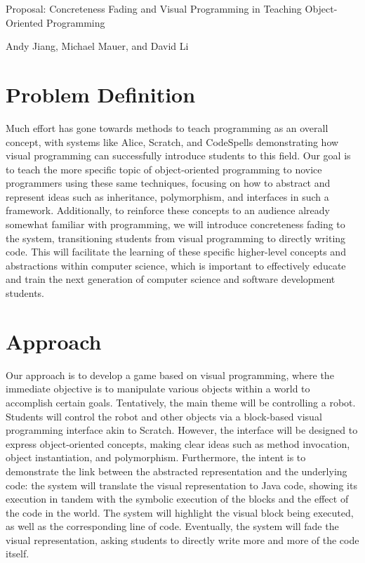 \documentclass[12pt,notitlepage]{article}
\begin{document}
\begingroup
  \centering
  {\Large Proposal: Concreteness Fading and Visual Programming in
  Teaching Object-Oriented Programming\\[1em]}

  Andy Jiang, Michael Mauer, and David Li\par
\endgroup

\section{Problem Definition}

Much effort has gone towards methods to teach programming as an
overall concept, with systems like Alice, Scratch, and CodeSpells
demonstrating how visual programming can successfully introduce
students to this field. Our goal is to teach the more specific topic
of object-oriented programming to novice programmers using these same
techniques, focusing on how to abstract and represent ideas such as
inheritance, polymorphism, and interfaces in such a framework.
Additionally, to reinforce these concepts to an audience already
somewhat familiar with programming, we will introduce concreteness
fading to the system, transitioning students from visual programming
to directly writing code. This will facilitate the learning of these
specific higher-level concepts and abstractions within computer
science, which is important to effectively educate and train the next
generation of computer science and software development students.

\section{Approach}

Our approach is to develop a game based on visual programming, where
the immediate objective is to manipulate various objects within a
world to accomplish certain goals. Tentatively, the main theme will be
controlling a robot. Students will control the robot and other objects
via a block-based visual programming interface akin to Scratch.
However, the interface will be designed to express object-oriented
concepts, making clear ideas such as method invocation, object
instantiation, and polymorphism. Furthermore, the intent is to
demonstrate the link between the abstracted representation and the
underlying code: the system will translate the visual representation
to Java code, showing its execution in tandem with the symbolic
execution of the blocks and the effect of the code in the world. The
system will highlight the visual block being executed, as well as the
corresponding line of code. Eventually, the system will fade the
visual representation, asking students to directly write more and more
of the code itself.
\end{document}
